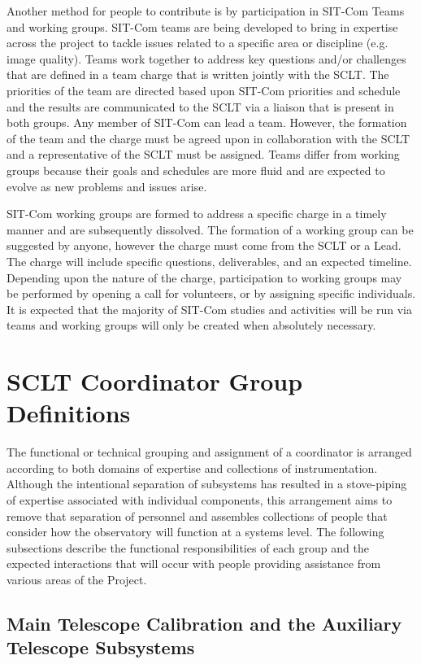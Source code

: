 \documentclass[SE,lsstdraft,authoryear,toc]{lsstdoc}
\begin{document}
Another method for people to contribute is by participation in SIT-Com Teams and working groups.
SIT-Com teams are being developed to bring in expertise across the project to tackle issues related to a specific area or discipline (e.g. image quality).
Teams work together to address key questions and/or challenges that are defined in a team charge that is written jointly with the SCLT.
The priorities of the team are directed based upon SIT-Com priorities and schedule and the results are communicated to the SCLT via a liaison that is present in both groups.
Any member of SIT-Com can lead a team.
However, the formation of the team and the charge must be agreed upon in collaboration with the SCLT and a representative of the SCLT must be assigned.
Teams differ from working groups because their goals and schedules are more fluid and are expected to evolve as new problems and issues arise.

SIT-Com working groups are formed to address a specific charge in a timely manner and are subsequently dissolved.
The formation of a working group can be suggested by anyone, however the charge must come from the SCLT or a Lead.
The charge will include specific questions, deliverables, and an expected timeline.
Depending upon the nature of the charge, participation to working groups may be performed by opening a call for volunteers, or by assigning specific individuals.
It is expected that the majority of SIT-Com studies and activities will be run via teams and working groups will only be created when absolutely necessary.

\section{SCLT Coordinator Group Definitions}
\label{sec:group_definitions}

The functional or technical grouping and assignment of a coordinator is arranged according to both domains of expertise and collections of instrumentation.
Although the intentional separation of subsystems has resulted in a stove-piping of expertise associated with individual components, this arrangement aims to remove that separation of personnel and assembles collections of people that consider how the observatory will function at a systems level.
The following subsections describe the functional responsibilities of each group and the expected interactions that will occur with people providing assistance from various areas of the Project.

\subsection{Main Telescope Calibration and the Auxiliary Telescope Subsystems}
\end{document}
